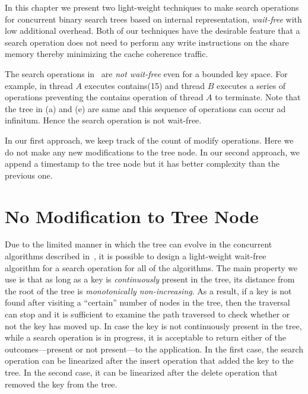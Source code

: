 \begin{limitscope}
\newcommand{\opRecord}{opRecord}
\newcommand{\OpRecord}{\textsf{OpRecord}}
\newcommand{\seekRecord}{seekRecord}
\newcommand{\SeekRecord}{\textsf{SeekRecord}}
\newcommand{\maximumgap}{49\%}
\newcommand{\maximumdrop}{10\%}
\newcommand{\dCounters}{DC}
\newcommand{\iCounters}{IC}
\newcommand{\labels}{labels}
\newcommand{\dcounters}{DC}
\newcommand{\icounters}{IC}
\newcommand{\myfigurescaletwo}{0.5}
In this chapter we present two light-weight techniques to make search operations for concurrent binary search trees based on internal representation, \emph{wait-free} with low additional overhead. Both of our techniques have the desirable feature that a search operation does not need to perform any write instructions on the share memory thereby minimizing the cache coherence traffic.


The search operations in~\cite{HowJon:2012:SPAA,DraVec+:2014:PPoPP,ArbAtt:2014:PODC,RamMit:2015:ICDCN,RamMit:2015:PPoPP} are \emph{not wait-free} even for a bounded key space. For example, in  thread $A$ executes \textsf{contains(15)} and thread $B$ executes a series of operations preventing the \textsf{contains} operation of thread $A$ to terminate. Note that the tree in (a) and (e) are same and this sequence of operations can occur ad infinitum. Hence the search operation is not wait-free.

In our first approach, we keep track of the count of modify operations. Here we do not make any new modifications to the tree node. In our second approach, we append a timestamp to the tree node but it has better complexity than the previous one.

\section{No Modification to Tree Node}
Due to the limited manner in which the tree can evolve in the concurrent algorithms described in~\cite{HowJon:2012:SPAA,DraVec+:2014:PPoPP,ArbAtt:2014:PODC,RamMit:2015:ICDCN,RamMit:2015:PPoPP}, it is possible to design a light-weight wait-free algorithm for a search operation for all of the algorithms. The main property we use is that as long as a key is \emph{continuously} present in the tree, its distance from the root of the tree is \emph{monotonically non-increasing}. As a result, if a key is not found after visiting a ``certain'' number of nodes in the tree, then the traversal can stop and it is sufficient to examine the path traversed to check whether or not the key has moved up. In case the key is not continuously present in the tree, while a search operation is in progress, it is acceptable to return either of the 
outcomes---present or not present---to the application. In the first case, the search operation can be linearized after the insert operation that added the key to the tree. In the second case, it can be linearized after the delete operation that removed the key from the tree. 


\end{limitscope}
